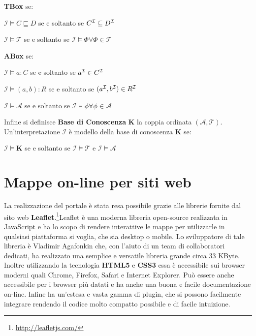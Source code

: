 \documentclass[a4paper,11pt]{article}
\newcommand{\I}{%
        \ensuremath{\mathcal{I}}\xspace}
\newcommand{\T}{%
  \ensuremath{\mathcal{T}}\xspace}
\newcommand{\A}{%
  \ensuremath{\mathcal{A}}\xspace}
\newcommand{\K}%
        {\ensuremath{\mathbf{K}}\xspace}
\begin{document}
\textbf{TBox} se:
\begin{center}
	$\I \models C \sqsubseteq D$ se e soltanto se $C^{\I} \subseteq D^{\I}$	
\end{center}
\begin{center}
	$\I \models \T$ se e soltanto se $\I \models \Phi \forall \Phi \in \T $
\end{center}
\textbf{ABox} se: 
\begin{center}
	$\I \models a:C$ se e soltanto se $ a^{\I} \in C^{\I}$
\end{center} 
\begin{center}
	$\I \models (a,b):R$ se e soltanto se $ (a^{\I},b^{\I}) \in R^{\I}$
\end{center}
\begin{center}
	$\I \models \A$ se e soltanto se $\I \models \phi \forall \phi \in \A $
\end{center}
Infine si definisce \textbf{Base di Conoscenza} $\K$ la coppia ordinata
$(\A,\T)$.  Un'interpretazione $\I$ è modello della base di conoscenza $\K$ se:
\begin{center}
	$\I \models \K$ se e soltanto se $\I \models \T$ e $\I \models \A $
\end{center}
\newpage
\section{Mappe on-line per siti web}
\label{sec:3}
La realizzazione del portale è stata resa possibile grazie alle librerie fornite dal sito web \textbf{Leaflet}.\footnote{\url{http://leafletjs.com/}}\newline Leaflet è una moderna libreria open-source realizzata in JavaScript e ha lo scopo di rendere interattive le mappe per utilizzarle in qualsiasi piattaforma si voglia, che sia desktop o mobile. Lo sviluppatore di tale libreria è Vladimir Agafonkin che, con l'aiuto di un team di collaboratori dedicati, ha realizzato una semplice e versatile libreria grande circa 33 KByte. Inoltre utilizzando la tecnologia \textbf{HTML5} e \textbf{CSS3} essa è accessibile sui browser moderni quali Chrome, Firefox, Safari e Internet Explorer. Può essere anche accessibile per i browser più datati e ha anche una buona e facile documentazione on-line. Infine ha un'estesa e vasta gamma di plugin, che si possono facilmente integrare rendendo il codice molto compatto possibile e di facile intuizione.
\end{document}
